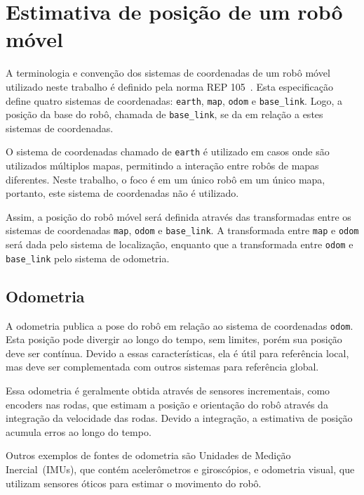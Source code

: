 \documentclass[repeatfields,xlists,xpacks,oneside,yearsonly]{ufrgscca}
\begin{document}
\section{Estimativa de posição de um robô móvel}

A terminologia e convenção dos sistemas de coordenadas de um robô
móvel utilizado neste trabalho é definido pela norma REP
105~\cite{rep_105}. Esta especificação define quatro sistemas de
coordenadas: \texttt{earth}, \texttt{map}, \texttt{odom} e
\texttt{base\_link}. Logo, a posição da base do robô, chamada de
\texttt{base\_link}, se da em relação a estes sistemas de
coordenadas.

O sistema de coordenadas chamado de \texttt{earth} é utilizado em
casos onde são utilizados múltiplos mapas, permitindo a interação
entre robôs de mapas diferentes. Neste trabalho, o foco é em um único
robô em um único mapa, portanto, este sistema de coordenadas não é
utilizado.

Assim, a posição do robô móvel será definida através das
transformadas entre os sistemas de coordenadas \texttt{map},
\texttt{odom} e \texttt{base\_link}. A transformada entre
\texttt{map} e \texttt{odom} será dada pelo sistema de localização,
enquanto que a transformada entre \texttt{odom} e \texttt{base\_link}
pelo sistema de odometria.


\subsection{Odometria}

A odometria publica a pose do robô em relação ao sistema de
coordenadas \texttt{odom}. Esta posição pode divergir ao longo do
tempo, sem limites, porém sua posição deve ser contínua. Devido a
essas características, ela é útil para referência local, mas deve ser
complementada com outros sistemas para referência global.

Essa odometria é geralmente obtida através de sensores incrementais,
como encoders nas rodas, que estimam a posição e orientação do robô
através da integração da velocidade das rodas. Devido a integração, a
estimativa de posição acumula erros ao longo do tempo.

Outros exemplos de fontes de odometria são Unidades de Medição
Inercial~(IMUs), que contém acelerômetros e giroscópios, e odometria
visual, que utilizam sensores óticos para estimar o movimento do
robô.
\end{document}
